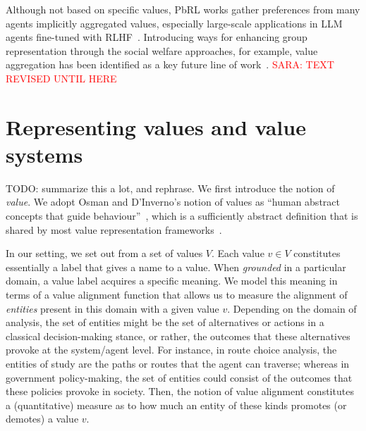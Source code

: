 \documentclass{ecai}
\begin{document}
Although not based on specific values, PbRL works gather preferences from many agents implicitly aggregated values, especially large-scale applications in LLM agents fine-tuned with RLHF~\cite{Song2024PROLLM}. Introducing ways for enhancing group representation through the social welfare approaches, for example, value aggregation has been identified as a key future line of work~\cite{proportionalityRLHFAggregationChandakGoelPeters2024}.
\textcolor{red}{SARA: TEXT REVISED UNTIL HERE}


\section{Representing values and value systems}\label{sec:background}
TODO: summarize this a lot, and rephrase.
We first introduce the notion of \textit{value}. We adopt Osman and D'Inverno's notion of values as ``human abstract concepts that guide behaviour''~\cite{Osman2024}, which is a sufficiently abstract definition that is shared by most value representation frameworks~\cite{andres2024icaart}.  %

In our setting, we set out from a set of values $V$. Each value $v \in V$ constitutes essentially a label that gives a name to a value. When \textit{grounded} in a particular domain, a value label acquires a specific meaning. We model this meaning in terms of a value alignment function that allows us to measure the alignment of \textit{entities} present in this domain with a given value $v$. Depending on the domain of analysis, the set of entities might be the set of alternatives or actions in a classical decision-making stance, or rather, the outcomes that these alternatives provoke at the system/agent level. For instance, in route choice analysis, the entities of study are the paths or routes that the agent can traverse; whereas in government policy-making, the set of entities could consist of the outcomes that these policies provoke in society. Then, the notion of value alignment constitutes a (quantitative) measure as to how much an entity of these kinds promotes (or demotes) a value $v$.
\end{document}
